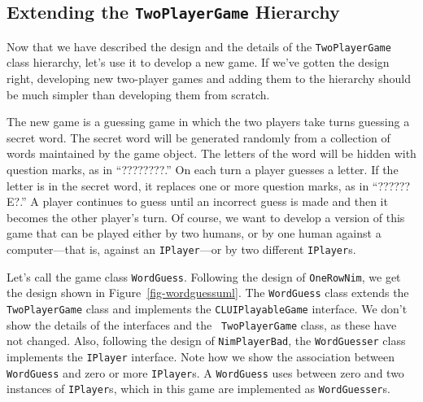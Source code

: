 \subsection{Extending the {\tt TwoPlayerGame} Hierarchy}

Now that we have described the design and the details of the
{\tt TwoPlayerGame} class hierarchy, let's use it to develop
a new game. If we've gotten the design right, developing
new two-player games and adding them to the hierarchy should 
be much simpler than developing them from scratch. 

The new game is a guessing game in which the two players take turns
guessing a secret word.  The secret word will be generated randomly
from a collection of words maintained by the game object. The letters
of the word will be hidden with question marks, as in ``????????.''
On each turn a player guesses a letter. If the letter is in the secret
word, it replaces one or more question marks, as in ``??????E?.''  A
player continues to guess until an incorrect guess is made and then it
becomes the other player's turn.  Of course, we want to develop a
version of this game that can be played either by two humans, or by
one human against a computer---that is, against an {\tt IPlayer}---or
by two different {\tt IPlayer}s.

\begin{figure}[h]
\end{figure}

Let's call the game class {\tt WordGuess}. Following the design of
{\tt OneRowNim}, we get the design shown in 
Figure~\ref{fig-wordguessuml}.  The {\tt WordGuess} class extends the
{\tt TwoPlayerGame} class and implements the {\tt CLUIPlayableGame}
interface. We don't show the details of the interfaces and the {\tt
TwoPlayerGame} class, as these have not changed.  Also, following the
design of {\tt NimPlayerBad}, the {\tt WordGuesser} class implements
the {\tt IPlayer} interface.  Note how we show the association between
{\tt WordGuess} and zero or more {\tt IPlayer}s.  A {\tt WordGuess}
uses between zero and two instances of {\tt IPlayer}s, which in
this game are implemented as {\tt WordGuesser}s.

